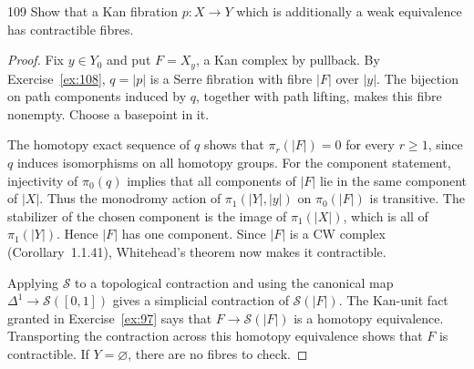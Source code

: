 \begin{exercise}{109}
Show that a Kan fibration $p\colon X\to Y$ which is additionally a weak
equivalence has contractible fibres.

\begin{proof}
Fix $y\in Y_0$ and put $F=X_y$, a Kan complex by pullback.
By Exercise~\ref{ex:108}, $q=|p|$ is a Serre fibration with fibre
$|F|$ over $|y|$.
The bijection on path components induced by $q$, together with path
lifting, makes this fibre nonempty.
Choose a basepoint in it.

The homotopy exact sequence of $q$ shows that
$\pi_r(|F|)=0$ for every $r\ge1$, since $q$ induces isomorphisms
on all homotopy groups.
For the component statement, injectivity of $\pi_0(q)$ implies that
all components of $|F|$ lie in the same component of $|X|$.
Thus the monodromy action of $\pi_1(|Y|,|y|)$ on $\pi_0(|F|)$ is
transitive. The stabilizer of the chosen component is the image
of $\pi_1(|X|)$, which is all of $\pi_1(|Y|)$.
Hence $|F|$ has one component.
Since $|F|$ is a CW complex (Corollary~1.1.41), Whitehead's theorem
now makes it contractible.

Applying $\mathcal S$ to a topological contraction and using the
canonical map $\Delta^1\to\mathcal S([0,1])$ gives a simplicial
contraction of $\mathcal S(|F|)$.
The Kan-unit fact granted in Exercise~\ref{ex:97} says that
$F\to\mathcal S(|F|)$ is a homotopy equivalence.
Transporting the contraction across this homotopy equivalence shows
that $F$ is contractible.
If $Y=\varnothing$, there are no fibres to check.
\end{proof}
\end{exercise}
